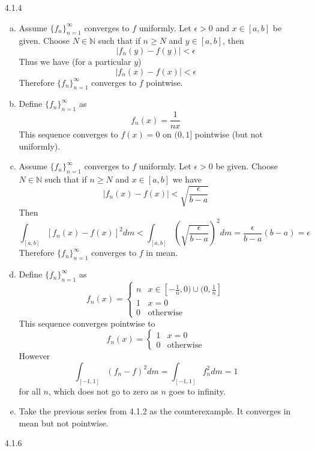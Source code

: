 \documentclass[../../Solutions.tex]{subfiles}
\begin{document}
\begin{itemize}
	\item [4.1.4]
	\begin{enumerate}[(a)]
		\item Assume $\{f_n\}_{n=1}^\infty$ converges to $f$ uniformly.
			Let $\epsilon > 0$ and $x \in [a,b]$ be given.
			Choose $N \in \mathbb{N}$ such that if $n \geq N$ and $y \in [a,b]$, then
			$$ |f_n(y)-f(y)| < \epsilon $$
			Thus we have (for a particular $y$)
			$$ |f_n(x)-f(x)| < \epsilon $$
			Therefore $\{f_n\}_{n=1}^\infty$ converges to $f$ pointwise.
		\item Define $\{f_n\}_{n=1}^\infty$ as
			$$ f_n(x) = \frac{1}{nx} $$
			This sequence converges to $f(x) = 0$ on $(0,1]$ pointwise (but not uniformly).
		\item Assume $\{f_n\}_{n=1}^\infty$ converges to $f$ uniformly.
			Let $\epsilon > 0$ be given.
			Choose $N \in \mathbb{N}$ such that if $n \geq N$ and $x \in [a,b]$ we have
			$$ |f_n(x)-f(x)| < \sqrt{\frac{\epsilon}{b-a}} $$
			Then
			$$ \int_{[a,b]} [f_n(x)-f(x)]^2 dm < \int_{[a,b]} \left(\sqrt{\frac{\epsilon}{b-a}}\right)^2 dm = \frac{\epsilon}{b-a}(b-a) = \epsilon $$
			Therefore $\{f_n\}_{n=1}^\infty$ converges to $f$ in mean.
		\item Define $\{f_n\}_{n=1}^\infty$ as
			\begin{equation*}
				f_n(x) = \begin{cases}
					n & x \in [-\frac{1}{n},0)\cup(0,\frac{1}{n}] \\
					1 & x = 0 \\
					0 & \text{otherwise}
				\end{cases}
			\end{equation*}
			This sequence converges pointwise to
			\begin{equation*}
				f_n(x) = \begin{cases}
					1 & x = 0 \\
					0 & \text{otherwise}
				\end{cases}
			\end{equation*}
			However
			\begin{equation*}
				\int_{[-1,1]} (f_n-f)^2 dm = \int_{[-1,1]} f_n^2 dm = 1
			\end{equation*}
			for all $n$, which does not go to zero as $n$ goes to infinity.
		\item Take the previous series from 4.1.2 as the counterexample.
			It converges in mean but not pointwise.
	\end{enumerate}
	
	\item [4.1.6]
	

\end{itemize}
\end{document}
